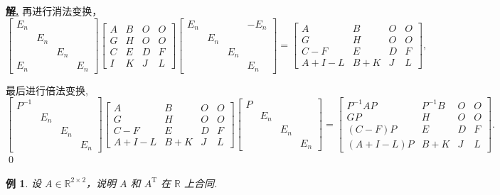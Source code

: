 \documentclass[10pt,openany]{article}
\theoremstyle{thmstyle} %
\theoremstyle{defstyle} %
\theoremstyle{prostyle} %
\theoremstyle{exastyle}
\newtheorem{example}[theorem]{例}
\theoremstyle{remstyle}
\newenvironment{solution}{\par\underline{\textbf{解.}} \;\fangsong}{\qed\par}
\newcommand{\T}{^{\text{T}}}
\newcommand{\R}{\mathbb{R}}
\begin{document}
\begin{solution}
	再进行消法变换，
	\[ \begin{bmatrix}
		E_n & & & \\
		& E_n & & \\
		& & E_n & \\
		E_n & & & E_n 
	\end{bmatrix}\begin{bmatrix}
	A & B & O & O \\
	G & H & O & O \\
	C & E & D & F \\
	I & K & J & L
	\end{bmatrix}\begin{bmatrix}
	E_n & & & -E_n \\
   & E_n & & \\
   & & E_n & \\
	 & & & E_n 
	\end{bmatrix}=\begin{bmatrix}
	A & B & O & O \\
	G & H & O & O \\
	C-F & E & D & F \\
	A+I-L & B+K & J & L
	\end{bmatrix}, \]
	
	最后进行倍法变换,
	\[ \begin{bmatrix}
		P^{-1} & & & \\
		& E_n & & \\
		& & E_n & \\
		 & & & E_n 
	\end{bmatrix}\begin{bmatrix}
	A & B & O & O \\
	G & H & O & O \\
	C-F & E & D & F \\
	A+I-L & B+K & J & L
	\end{bmatrix}\begin{bmatrix}
	P & & & \\
	& E_n & & \\
	& & E_n & \\
	& & & E_n 
	\end{bmatrix}=\begin{bmatrix}
	P^{-1}AP & P^{-1}B & O & O \\
	GP & H & O & O \\
	(C-F)P & E & D & F \\
	(A+I-L)P & B+K & J & L
	\end{bmatrix}. \]
\end{solution}

\begin{example}
	设 \( A \in \R^{2 \times 2} \)，说明 \( A \) 和 \( A\T \) 在 \( \R \) 上合同.
\end{example}
\end{document}
